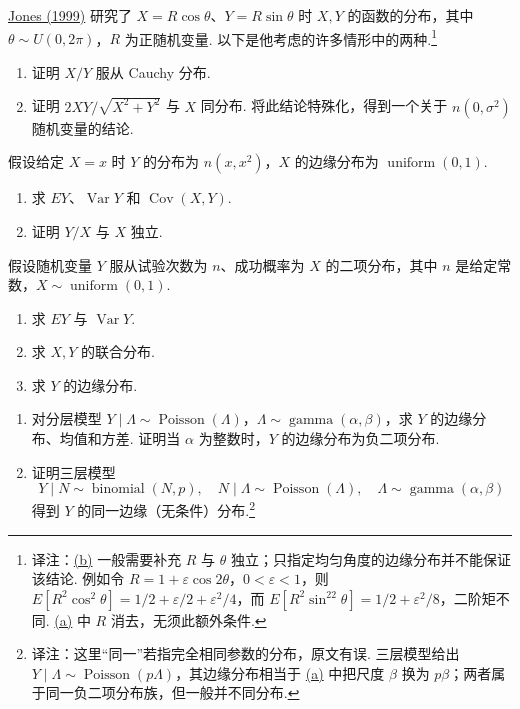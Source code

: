 \begin{exercise}\label{exercise:4.29}
\hyperref[bib:source181]{Jones (1999)} 研究了 $X=R\cos\theta$、$Y=R\sin\theta$ 时 $X,Y$ 的函数的分布，其中 $\theta\sim U(0,2\pi)$，$R$ 为正随机变量. 以下是他考虑的许多情形中的两种.\footnote{译注：\hyperref[itm:exercise:4.29:b]{(b)} 一般需要补充 $R$ 与 $\theta$ 独立；只指定均匀角度的边缘分布并不能保证该结论. 例如令 $R=1+\varepsilon\cos2\theta$，$0<\varepsilon<1$，则 $E[R^2\cos^2\theta]=1/2+\varepsilon/2+\varepsilon^2/4$，而 $E[R^2\sin^22\theta]=1/2+\varepsilon^2/8$，二阶矩不同. \hyperref[itm:exercise:4.29:a]{(a)} 中 $R$ 消去，无须此额外条件.}
\begin{enumerate}
\item[(a)]\label{itm:exercise:4.29:a} 证明 $X/Y$ 服从 Cauchy 分布.
\item[(b)]\label{itm:exercise:4.29:b} 证明 $2XY/\sqrt{X^2+Y^2}$ 与 $X$ 同分布. 将此结论特殊化，得到一个关于 $n(0,\sigma^2)$ 随机变量的结论.
\end{enumerate}
\end{exercise}
\begin{exercise}\label{exercise:4.30}
假设给定 $X=x$ 时 $Y$ 的分布为 $n(x,x^2)$，$X$ 的边缘分布为 $\operatorname{uniform}(0,1)$.
\begin{enumerate}
\item[(a)] 求 $EY$、$\operatorname{Var}Y$ 和 $\operatorname{Cov}(X,Y)$.
\item[(b)] 证明 $Y/X$ 与 $X$ 独立.
\end{enumerate}
\end{exercise}
\begin{exercise}\label{exercise:4.31}
假设随机变量 $Y$ 服从试验次数为 $n$、成功概率为 $X$ 的二项分布，其中 $n$ 是给定常数，$X\sim\operatorname{uniform}(0,1)$.
\begin{enumerate}
\item[(a)] 求 $EY$ 与 $\operatorname{Var}Y$.
\item[(b)] 求 $X,Y$ 的联合分布.
\item[(c)] 求 $Y$ 的边缘分布.
\end{enumerate}
\end{exercise}
\begin{exercise}\label{exercise:4.32}\leavevmode
\begin{enumerate}
\item[(a)]\label{itm:exercise:4.32:a} 对分层模型 $Y\mid\Lambda\sim\operatorname{Poisson}(\Lambda)$，$\Lambda\sim\operatorname{gamma}(\alpha,\beta)$，求 $Y$ 的边缘分布、均值和方差. 证明当 $\alpha$ 为整数时，$Y$ 的边缘分布为负二项分布.
\item[(b)] 证明三层模型
$$Y\mid N\sim\operatorname{binomial}(N,p),\quad N\mid\Lambda\sim\operatorname{Poisson}(\Lambda),\quad\Lambda\sim\operatorname{gamma}(\alpha,\beta)$$
得到 $Y$ 的同一边缘（无条件）分布.\footnote{译注：这里“同一”若指完全相同参数的分布，原文有误. 三层模型给出 $Y\mid\Lambda\sim\operatorname{Poisson}(p\Lambda)$，其边缘分布相当于 \hyperref[itm:exercise:4.32:a]{(a)} 中把尺度 $\beta$ 换为 $p\beta$；两者属于同一负二项分布族，但一般并不同分布.}
\end{enumerate}
\end{exercise}

